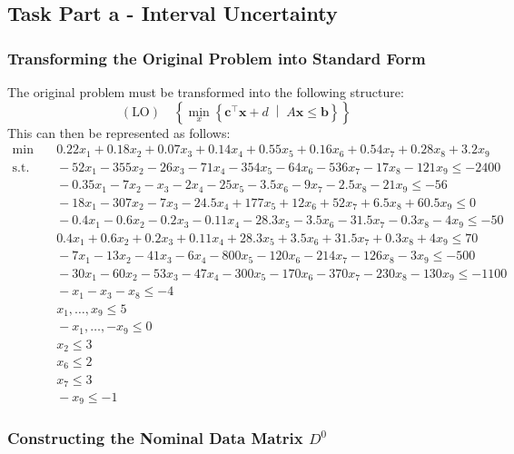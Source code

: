 \documentclass[a4paper,12pt]{article}
\begin{document}
\subsection*{Task Part a - Interval Uncertainty}

\subsubsection*{Transforming the Original Problem into Standard Form}

The original problem must be transformed into the following structure:
\[
(\text{LO}) \quad \left\{ \min_{x} \left\{ \mathbf{c}^\top \mathbf{x} + d \; \middle| \; A\mathbf{x} \leq \mathbf{b} \right\} \right\}
\]
This can then be represented as follows:
\[
\begin{aligned}
    \min & \quad 0.22x_1 + 0.18x_2 + 0.07x_3 + 0.14x_4 + 0.55x_5 + 0.16x_6 + 0.54x_7 + 0.28x_8 + 3.2x_9 \\
    \text{s.t.} & \quad -52x_1 - 355x_2 - 26x_3 - 71x_4 - 354x_5 - 64x_6 - 536x_7 - 17x_8 - 121x_9 \leq -2400 \\
    & \quad -0.35x_1 - 7x_2 - x_3 - 2x_4 - 25x_5 - 3.5x_6 - 9x_7 - 2.5x_8 - 21x_9 \leq -56 \\
    & \quad -18x_1 - 307x_2 - 7x_3 - 24.5x_4 + 177x_5 + 12x_6 + 52x_7 + 6.5x_8 + 60.5x_9 \leq 0 \\
    & \quad -0.4x_1 - 0.6x_2 - 0.2x_3 - 0.11x_4 - 28.3x_5 - 3.5x_6 - 31.5x_7 - 0.3x_8 - 4x_9 \leq -50 \\
    & \quad 0.4x_1 + 0.6x_2 + 0.2x_3 + 0.11x_4 + 28.3x_5 + 3.5x_6 + 31.5x_7 + 0.3x_8 + 4x_9 \leq 70 & \\
    & \quad -7x_1 - 13x_2 - 41x_3 - 6x_4 - 800x_5 - 120x_6 - 214x_7 - 126x_8 - 3x_9 \leq -500 \\
    & \quad -30x_1 - 60x_2 - 53x_3 - 47x_4 - 300x_5 - 170x_6 - 370x_7 - 230x_8 - 130x_9 \leq -1100 \\
    & \quad -x_1 - x_3 - x_8 \leq -4 \\
    & \quad x_1, \dots, x_9 \leq 5 \\
    & \quad - x_1, \dots, - x_9 \leq 0 \\
    & \quad x_2 \leq 3 \\
    & \quad x_6 \leq 2 \\
    & \quad x_7 \leq 3 \\
    & \quad - x_9 \leq - 1
\end{aligned}
\]

\subsubsection*{Constructing the Nominal Data Matrix $D^0$}
\end{document}
